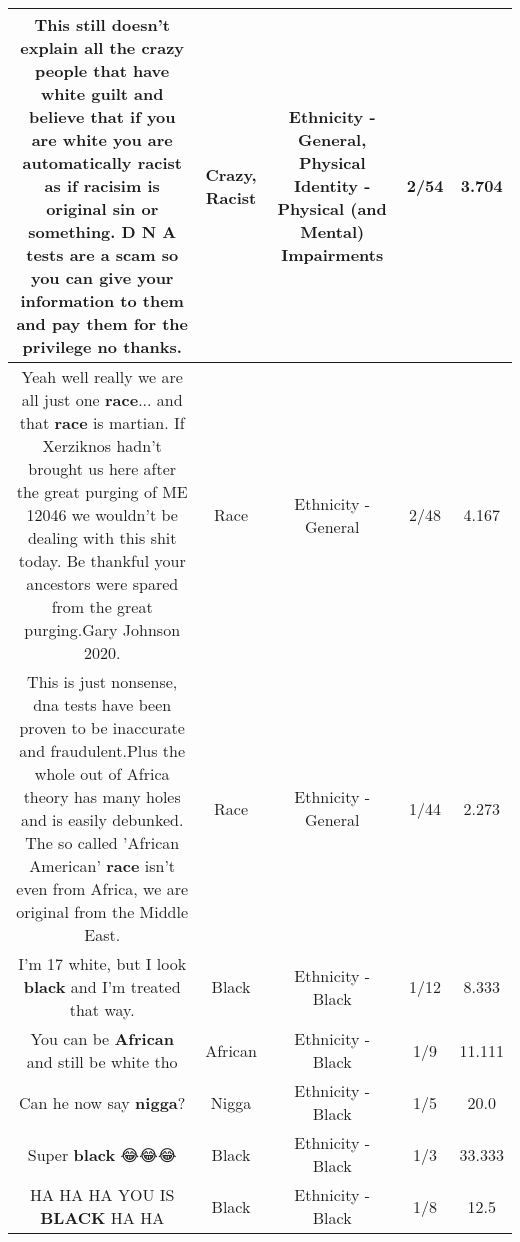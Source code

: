 \documentclass[11pt]{article}
\newlength\mylength
\begin{document}
\begin{center}
\begin{longtable}{|C{.65\mylength}|C{.30\mylength}|C{.12\mylength}|C{.12\mylength}|C{.12\mylength}|}
  \small This still doesn't explain all the \textbf{crazy} people that have white guilt and believe that if you are white you are automatically \textbf{racist} as if racisim is original sin or something.  D N A tests are a scam so you can give your information to them and pay them for the privilege no thanks.\normalsize   & Crazy, Racist & Ethnicity - General, Physical Identity - Physical (and Mental) Impairments & 2/54 & 3.704 \\  \hline
  \small Yeah well really we are all just one \textbf{race}... and that \textbf{race} is martian. If Xerziknos hadn't brought us here after the great purging of ME 12046 we wouldn't be dealing with this shit today. Be thankful your ancestors were spared from the great purging.Gary Johnson 2020.\normalsize   & Race & Ethnicity - General & 2/48 & 4.167 \\  \hline
  \small This is just nonsense, dna tests have been proven to be inaccurate and fraudulent.Plus the whole out of Africa theory has many holes and is easily debunked. The so called 'African American' \textbf{race} isn't even from Africa, we are original from the Middle East.\normalsize   & Race & Ethnicity - General & 1/44 & 2.273 \\  \hline
  \small I'm 17 white, but I look \textbf{black} and I'm treated that way.\normalsize   & Black & Ethnicity - Black & 1/12 & 8.333 \\  \hline
  \small You can be \textbf{African} and still be white tho\normalsize   & African & Ethnicity - Black & 1/9 & 11.111 \\  \hline
  \small Can he now say \textbf{nigga}?\normalsize   & Nigga & Ethnicity - Black & 1/5 & 20.0 \\  \hline
  \small Super \textbf{black} 😂😂😂\normalsize   & Black & Ethnicity - Black & 1/3 & 33.333 \\  \hline
  \small HA HA HA YOU IS \textbf{BLACK} HA HA\normalsize   & Black & Ethnicity - Black & 1/8 & 12.5 \\  \hline

\end{longtable}
\end{center}
\end{document}
